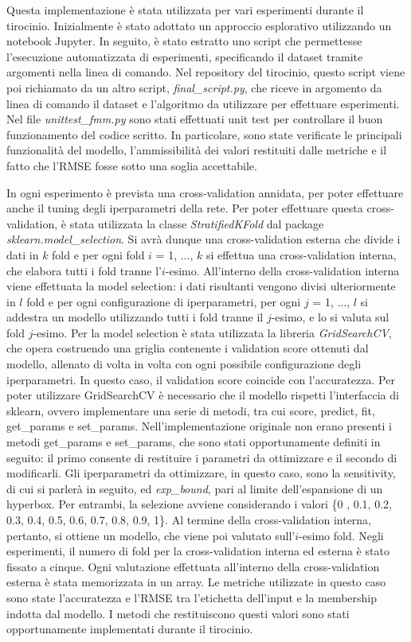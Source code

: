 \documentclass[11pt,  oneside, openany]{book}
\begin{document}
Questa implementazione è stata utilizzata per vari esperimenti durante il tirocinio. Inizialmente è stato adottato un approccio esplorativo utilizzando un notebook Jupyter. In seguito, è stato estratto uno script che permettesse l'esecuzione automatizzata di esperimenti, specificando il dataset tramite argomenti nella linea di comando. Nel repository del tirocinio, questo script viene poi richiamato da un altro script, \textit{final\_script.py}, che riceve in argomento da linea di comando il dataset e l'algoritmo da utilizzare per effettuare esperimenti. Nel file \textit {unittest\_fmm.py} sono stati effettuati unit test per controllare il buon funzionamento del codice scritto. In particolare, sono state verificate le principali funzionalità del modello, l'ammissibilità dei valori restituiti dalle metriche e il fatto che l'RMSE fosse sotto una soglia accettabile. 

In ogni esperimento è prevista una cross-validation annidata, per poter effettuare anche il tuning degli iperparametri della rete. Per poter effettuare questa cross-validation, è stata utilizzata la classe \textit{StratifiedKFold} dal package \textit{sklearn.model\_selection}. Si avrà dunque una cross-validation esterna che divide i dati in $k$ fold e per ogni fold $i$ = 1, ..., $k$ si effettua una cross-validation interna, che elabora tutti i fold tranne l'$i$-esimo. All'interno della cross-validation interna viene effettuata la model selection: i dati risultanti vengono divisi ulteriormente in $l$ fold e per ogni configurazione di iperparametri, per ogni $j$ = 1, ..., $l$ si addestra un modello utilizzando tutti i fold tranne il $j$-esimo, e lo si valuta sul fold $j$-esimo. Per la model selection è stata utilizzata la libreria \textit{GridSearchCV}, che opera costruendo una griglia contenente i validation score ottenuti dal modello, allenato di volta in volta con ogni possibile configurazione degli iperparametri. In questo caso, il validation score coincide con l'accuratezza. Per poter utilizzare GridSearchCV è necessario che il modello rispetti l'interfaccia di sklearn, ovvero implementare una serie di metodi, tra cui score, predict, fit, get\_params e set\_params. Nell'implementazione originale non erano presenti i metodi get\_params e set\_params, che sono stati opportunamente definiti in seguito: il primo consente di restituire i parametri da ottimizzare e il secondo di modificarli. Gli iperparametri da ottimizzare, in questo caso, sono la sensitivity, di cui si parlerà in seguito, ed \textit{exp\_bound}, pari al limite dell'espansione di un hyperbox. Per entrambi, la selezione avviene considerando i valori \{0 , 0.1, 0.2, 0.3, 0.4, 0.5, 0.6, 0.7, 0.8, 0.9, 1\}. Al termine della cross-validation interna, pertanto, si ottiene un modello, che viene poi valutato sull'$i$-esimo fold. Negli esperimenti, il numero di fold per la cross-validation interna ed esterna è stato fissato a cinque. Ogni valutazione effettuata all'interno della cross-validation esterna è stata memorizzata in un array. Le metriche utilizzate in questo caso sono state l'accuratezza e l'RMSE tra l'etichetta dell'input e la membership indotta dal modello. I metodi che restituiscono questi valori sono stati opportunamente implementati durante il tirocinio. 
\end{document}
